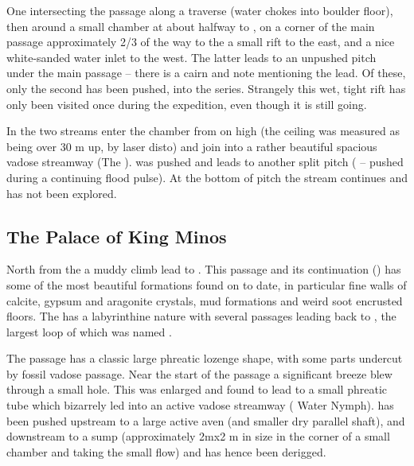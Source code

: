 One intersecting the passage along a traverse (water chokes into boulder floor), then around a small chamber at about halfway to , on a corner of the main passage approximately 2/3 of the way to
the  a small rift to the east, and a nice white-sanded water inlet to the west. The latter leads to an unpushed pitch under the main passage -- there is a cairn and note mentioning the lead. Of these,
only the second has been pushed, into the  series. Strangely this wet, tight rift has only been visited once during the
expedition, even though it is still going.

In the  two streams enter the chamber from on high
(the ceiling was measured as being over 30 m up, by laser disto) and join into a rather beautiful spacious vadose streamway (The ).
 was pushed and leads to another split pitch ( -- pushed during a continuing flood pulse).
At the bottom of  pitch the stream continues and has not been explored.


\subsection{The Palace of King Minos}

North from the  a muddy climb lead to . This passage and its continuation () has some of the most beautiful formations found on  to date, in particular fine walls of calcite, gypsum and aragonite crystals, mud formations and weird soot encrusted floors. The  has a labyrinthine nature with several passages leading back to , the largest loop of which was named .

The passage has a classic large phreatic lozenge shape, with some parts undercut by fossil vadose passage. Near the start of the passage a
significant breeze blew through a small hole. This was enlarged and found to lead to a small phreatic tube which bizarrely led into an active vadose streamway ( \textemdash{} Water Nymph).  has been pushed upstream to a large active aven (and smaller dry parallel shaft), and downstream to a sump (approximately 2mx2 m in size in the corner of a small chamber and taking the small flow) and has hence been derigged.


